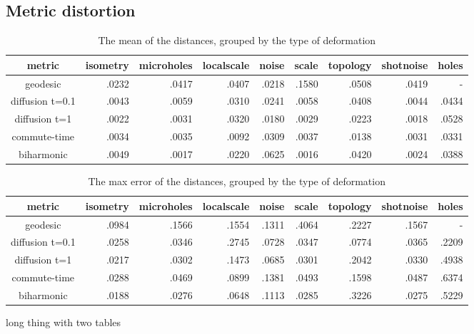 \subsection{Metric distortion}
\begin{table}[h]
	\caption{The mean of the distances, grouped by the type of deformation}
	\begin{tabular}{c*{8}{|r}|}
		metric & isometry & microholes & localscale & noise & scale & topology & shotnoise & holes \\
		\hline
		geodesic & .0232 & .0417 & .0407 & .0218 & .1580 & .0508 & .0419 & - \\
		diffusion t=0.1 & .0043 & .0059 & .0310 & .0241 & .0058 & .0408 & .0044 & .0434 \\
		diffusion t=1 & .0022 & .0031 & .0320 & .0180 & .0029 & .0223 & .0018 & .0528 \\
		commute-time & .0034 & .0035 & .0092 & .0309 & .0037 & .0138 & .0031 & .0331 \\
		biharmonic & .0049 & .0017 & .0220 & .0625 & .0016 & .0420 & .0024 & .0388 \\
	\end{tabular}
	\label{tab:mean}
\end{table}
\begin{table}[h]
	\caption{The max error of the distances, grouped by the type of deformation}
	\begin{tabular}{c*{8}{|r}|}
		metric & isometry & microholes & localscale & noise & scale & topology & shotnoise & holes \\
		\hline
		geodesic & .0984 & .1566 & .1554 & .1311 & .4064 & .2227 & .1567 & - \\
		diffusion t=0.1 & .0258 & .0346 & .2745 & .0728 & .0347 & .0774 & .0365 & .2209 \\
		diffusion t=1 & .0217 & .0302 & .1473 & .0685 & .0301 & .2042 & .0330 & .4938 \\
		commute-time & .0288 & .0469 & .0899 & .1381 & .0493 & .1598 & .0487 & .6374 \\
		biharmonic & .0188 & .0276 & .0648 & .1113 & .0285 & .3226 & .0275 & .5229 \\
	\end{tabular}
	\label{tab:maxerror}
\end{table}

long thing with two tables
